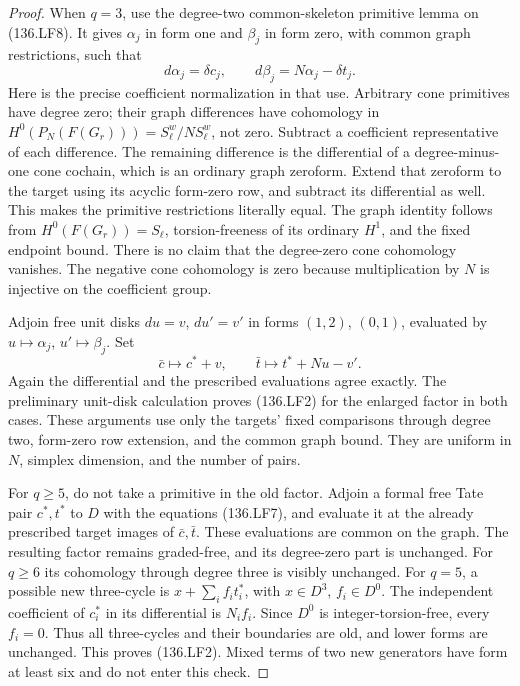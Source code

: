 \begin{proof}
When \(q=3\), use the degree-two common-skeleton primitive
lemma on (136.LF8). It gives \(\alpha_j\) in form one and
\(\beta_j\) in form zero, with common graph restrictions, such that
\[
                d\alpha_j=\delta c_j,\qquad
                d\beta_j=N\alpha_j-\delta t_j.           \tag{136.LF10}
\]
Here is the precise coefficient normalization in that use.
Arbitrary cone primitives have degree zero; their graph
differences have cohomology in
\(H^0(P_N(F(G_r)))=S_\ell^w/NS_\ell^w\), not zero.
Subtract a coefficient representative of each difference.
The remaining difference is the differential of a degree-minus-one
cone cochain, which is an ordinary graph zeroform. Extend that
zeroform to the target using its acyclic form-zero row, and
subtract its differential as well. This makes the primitive
restrictions literally equal. The graph identity follows from
\(H^0(F(G_r))=S_\ell\), torsion-freeness of its ordinary
\(H^1\), and the fixed endpoint bound. There is no claim
that the degree-zero cone cohomology vanishes. The negative
cone cohomology is zero because multiplication by \(N\)
is injective on the coefficient group.

Adjoin free unit disks \(du=v\), \(du'=v'\) in forms
\((1,2)\), \((0,1)\), evaluated by
\(u\mapsto\alpha_j\), \(u'\mapsto\beta_j\).
Set
\[
                    \bar c\longmapsto c^*+v,\qquad
                    \bar t\longmapsto t^*+Nu-v'.         \tag{136.LF11}
\]
Again the differential and the prescribed evaluations agree
exactly. The preliminary unit-disk calculation proves (136.LF2)
for the enlarged factor in both cases. These arguments use only
the targets' fixed comparisons through degree two, form-zero
row extension, and the common graph bound. They are uniform
in \(N\), simplex dimension, and the number of pairs.

For \(q\geq5\), do not take a primitive in the old factor.
Adjoin a formal free Tate pair \(c^*,t^*\) to \(D\) with
the equations (136.LF7), and evaluate it at the already prescribed
target images of \(\bar c,\bar t\). These evaluations are
common on the graph. The resulting factor remains graded-free,
and its degree-zero part is unchanged. For \(q\geq6\)
its cohomology through degree three is visibly unchanged. For
\(q=5\), a possible new three-cycle is
\(x+\sum_i f_i t_i^*\), with \(x\in D^3\), \(f_i\in D^0\).
The independent coefficient of \(c_i^*\) in its differential
is \(N_i f_i\). Since \(D^0\) is integer-torsion-free,
every \(f_i=0\). Thus all three-cycles and their boundaries
are old, and lower forms are unchanged. This proves (136.LF2).
Mixed terms of two new generators have form at least six and
do not enter this check.


\end{proof}
